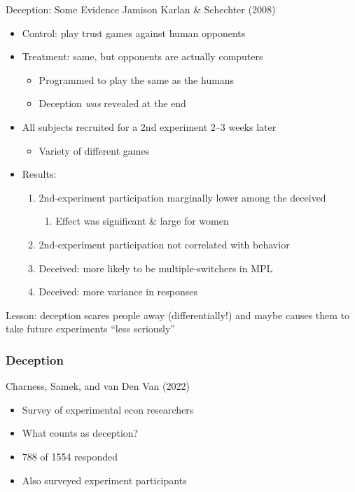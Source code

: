 \begin{frame}{Deception: Some Evidence}
Jamison Karlan \& Schechter (2008)
\begin{itemize}
    \item Control: play trust games against human opponents
    \item Treatment: same, but opponents are actually computers
    \begin{itemize}
        \item Programmed to play the same as the humans
        \item Deception \textit{was} revealed at the end
    \end{itemize}
    \item All subjects recruited for a 2nd experiment 2--3 weeks later
    \begin{itemize}
        \item Variety of different games
    \end{itemize}
    \item Results:
    \begin{enumerate}
        \item 2nd-experiment participation marginally lower among the deceived
        \begin{enumerate}
            \item Effect was significant \& large for women
        \end{enumerate}
        \item 2nd-experiment participation not correlated with behavior
        \item Deceived: more likely to be multiple-switchers in MPL
        \item Deceived: more variance in responses
    \end{enumerate}
\end{itemize}
Lesson: deception scares people away (differentially!) and maybe causes them to take future experiments ``less seriously''
\end{frame}


\begin{frame}
\frametitle{Deception}
Charness, Samek, and van Den Van (2022)
\begin{itemize}
    \item Survey of experimental econ researchers
    \item What counts as deception?
    \item 788 of 1554 responded
    \item Also surveyed experiment participants
\end{itemize}
\end{frame}


